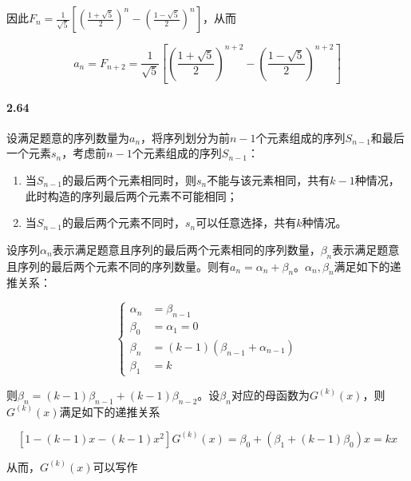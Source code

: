 \documentclass{../notes}
\newcommand{\Gx}[1]{G^{(#1)}(x)}
\begin{document}
    因此$F_{n} = \frac{1}{\sqrt 5} \left[\left(\frac{1 + \sqrt 5}{2}\right)^n - \left(\frac{1 - \sqrt 5}{2}\right)^n\right]$，从而

    \begin{equation}
        a_{n} = F_{n+2} =\frac{1}{\sqrt 5} \left[\left(\frac{1 + \sqrt 5}{2}\right)^{n+2} - \left(\frac{1 - \sqrt 5}{2}\right)^{n+2}\right]
    \end{equation}

    \paragraph*{2.64} 设满足题意的序列数量为$a_n$，将序列划分为前$n-1$个元素组成的序列$S_{n-1}$和最后一个元素$s_n$，考虑前$n-1$个元素组成的序列$S_{n-1}$：

    \begin{enumerate}
        \item 当$S_{n-1}$的最后两个元素相同时，则$s_n$不能与该元素相同，共有$k-1$种情况，此时构造的序列最后两个元素不可能相同；
        \item 当$S_{n-1}$的最后两个元素不同时，$s_n$可以任意选择，共有$k$种情况。
    \end{enumerate}

    设序列$\alpha_n$表示满足题意且序列的最后两个元素相同的序列数量，$\beta_n$表示满足题意且序列的最后两个元素不同的序列数量。则有$a_n = \alpha_n + \beta_n$。$\alpha_n, \beta_n$满足如下的递推关系：

    \begin{equation}
        \left\{
        \begin{aligned}
            \alpha_n &= \beta_{n-1}\\
            \beta_0 &= \alpha_1 = 0 \\
            \beta_n &= (k-1)(\beta_{n-1} + \alpha_{n-1})\\
            \beta_1 &= k
        \end{aligned}
        \right.
    \end{equation}

    则$\beta_n = (k - 1)\beta_{n-1} + (k-1)\beta_{n-2}$。设$\beta_n$对应的母函数为$\Gx k$，则$\Gx k$满足如下的递推关系

    \begin{equation}
        \left[1 - (k-1)x - (k-1)x^2\right]\Gx k = \beta_0 + (\beta_1 + (k-1)\beta_0) x = kx
    \end{equation}

    从而，$\Gx k$可以写作
\end{document}
